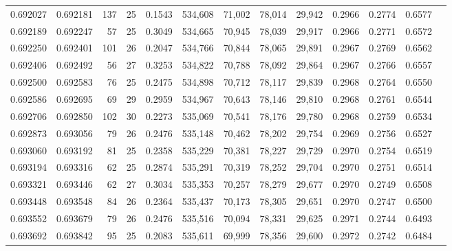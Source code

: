 \begin{tabular}{rrrrrrrrrrrrr}
0.692027 & 0.692181 &   137 &  25 &                                     0.1543 & 534,608 &  71,002 &  78,014 &  29,942 & 0.2966 & 0.2774 & 0.6577 \\
0.692189 & 0.692247 &    57 &  25 &                                     0.3049 & 534,665 &  70,945 &  78,039 &  29,917 & 0.2966 & 0.2771 & 0.6572 \\
0.692250 & 0.692401 &   101 &  26 &                                     0.2047 & 534,766 &  70,844 &  78,065 &  29,891 & 0.2967 & 0.2769 & 0.6562 \\
0.692406 & 0.692492 &    56 &  27 &                                     0.3253 & 534,822 &  70,788 &  78,092 &  29,864 & 0.2967 & 0.2766 & 0.6557 \\
0.692500 & 0.692583 &    76 &  25 &                                     0.2475 & 534,898 &  70,712 &  78,117 &  29,839 & 0.2968 & 0.2764 & 0.6550 \\
0.692586 & 0.692695 &    69 &  29 &                                     0.2959 & 534,967 &  70,643 &  78,146 &  29,810 & 0.2968 & 0.2761 & 0.6544 \\
0.692706 & 0.692850 &   102 &  30 &                                     0.2273 & 535,069 &  70,541 &  78,176 &  29,780 & 0.2968 & 0.2759 & 0.6534 \\
0.692873 & 0.693056 &    79 &  26 &                                     0.2476 & 535,148 &  70,462 &  78,202 &  29,754 & 0.2969 & 0.2756 & 0.6527 \\
0.693060 & 0.693192 &    81 &  25 &                                     0.2358 & 535,229 &  70,381 &  78,227 &  29,729 & 0.2970 & 0.2754 & 0.6519 \\
0.693194 & 0.693316 &    62 &  25 &                                     0.2874 & 535,291 &  70,319 &  78,252 &  29,704 & 0.2970 & 0.2751 & 0.6514 \\
0.693321 & 0.693446 &    62 &  27 &                                     0.3034 & 535,353 &  70,257 &  78,279 &  29,677 & 0.2970 & 0.2749 & 0.6508 \\
0.693448 & 0.693548 &    84 &  26 &                                     0.2364 & 535,437 &  70,173 &  78,305 &  29,651 & 0.2970 & 0.2747 & 0.6500 \\
0.693552 & 0.693679 &    79 &  26 &                                     0.2476 & 535,516 &  70,094 &  78,331 &  29,625 & 0.2971 & 0.2744 & 0.6493 \\
0.693692 & 0.693842 &    95 &  25 &                                     0.2083 & 535,611 &  69,999 &  78,356 &  29,600 & 0.2972 & 0.2742 & 0.6484 \\

\end{tabular}
